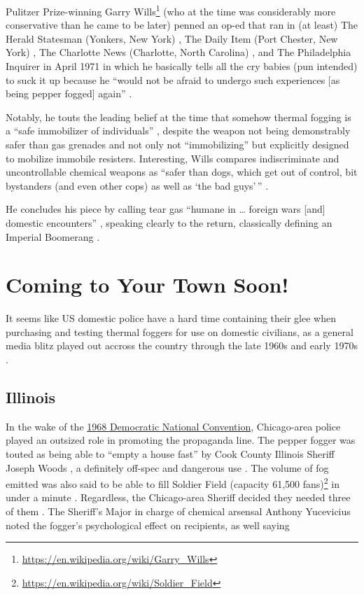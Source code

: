 \documentclass[
  12pt,
]{krantz}
\renewcommand{\href}[2]{#2\footnote{\url{#1}}}
\begin{document}
Pulitzer Prize-winning \href{https://en.wikipedia.org/wiki/Garry_Wills}{Garry Wills} (who at the time was considerably more conservative than he came to be later) penned an op-ed that ran in (at least) The Herald Statesman (Yonkers, New York) \citep{Wills1971a}, The Daily Item (Port Chester, New York) \citep{Wills1971b}, The Charlotte News (Charlotte, North Carolina) \citep{Wills1971c}, and The Philadelphia Inquirer \citep{Wills1971d} in April 1971 in which he basically tells all the cry babies (pun intended) to suck it up because he ``would not be afraid to undergo such experiences {[}as being pepper fogged{]} again'' \citep{Wills1971a}.

Notably, he touts the leading belief at the time that somehow thermal fogging is a ``safe immobilizer of individuals'' \citep{Wills1971a}, despite the weapon not being demonstrably safer than gas grenades and not only not ``immobilizing'' but explicitly designed to mobilize immobile resisters.
Interesting, Wills compares indiscriminate and uncontrollable chemical weapons as ``safer than dogs, which get out of control, bit bystanders (and even other cops) as well as `the bad guys'\,'' \citep{Wills1971a}.

He concludes his piece by calling tear gas ``humane in \ldots{} foreign wars {[}and{]} domestic encounters'' \citep{Wills1971a}, speaking clearly to the return, classically defining an Imperial Boomerang \citep{Cesaire1950, Arendt1951, Foucault1976}.

\hypertarget{coming-to-your-town-soon}{%
\section*{Coming to Your Town Soon!}\label{coming-to-your-town-soon}}


It seems like US domestic police have a hard time containing their glee when purchasing and testing thermal foggers for use on domestic civilians, as a general media blitz played out accross the country through the late 1960s and early 1970s \citep{PlainDealer1971}.

\hypertarget{illinois}{%
\subsection*{Illinois}\label{illinois}}


In the wake of the \protect\hyperlink{ChicagoIL1968_08_26}{1968 Democratic National Convention}, Chicago-area police played an outsized role in promoting the propaganda line.
The pepper fogger was touted as being able to ``empty a house fast'' by Cook County Illinois Sheriff Joseph Woods \citep{MtVernonRegisterNews1969_04_09, DailyDispatch1969_04_09}, a definitely off-spec and dangerous use \citep{Nixalite2009b}.
The volume of fog emitted was also said to be able to fill \href{https://en.wikipedia.org/wiki/Soldier_Field}{Soldier Field (capacity 61,500 fans)} in under a minute \citep{DailyDispatch1969_04_09}.
Regardless, the Chicago-area Sheriff decided they needed three of them \citep{DailyDispatch1969_04_09}.
The Sheriff's Major in charge of chemical arsensal Anthony Yucevicius noted the fogger's psychological effect on recipients, as well saying
\end{document}
